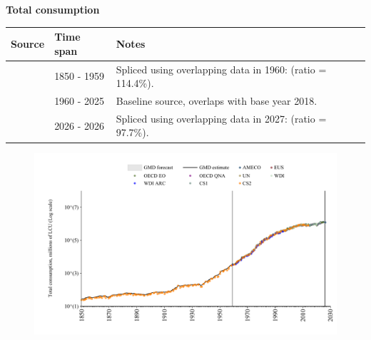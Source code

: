 \documentclass[12pt,a4paper,landscape]{article}
\begin{document}
\begin{adjustbox}{max totalsize={\paperwidth}{\paperheight},center}
\begin{minipage}[t][\textheight][t]{\textwidth}
\vspace*{0.5cm}
{}
\begin{center}
{\Large\bfseries Total consumption}
\end{center}
\vspace{0.5cm}
\begin{table}[H]
\centering
\small
\begin{tabular}{|l|l|l|}
\hline
\textbf{Source} & \textbf{Time span} & \textbf{Notes} \\
\hline
\rowcolor{white}\cite{CS2_ESP}& 1850 - 1959 &Spliced using overlapping data in 1960: (ratio = 114.4\%). \\
\rowcolor{lightgray}\cite{OECD_EO}& 1960 - 2025 &Baseline source, overlaps with base year 2018. \\
\rowcolor{white}\cite{AMECO}& 2026 - 2026 &Spliced using overlapping data in 2027: (ratio = 97.7\%). \\
\hline
\end{tabular}
\end{table}
\begin{figure}[H]
\centering
\includegraphics[width=\textwidth,height=0.6\textheight,keepaspectratio]{graphs/ESP_cons.pdf}
\end{figure}
\end{minipage}
\end{adjustbox}
\end{document}
